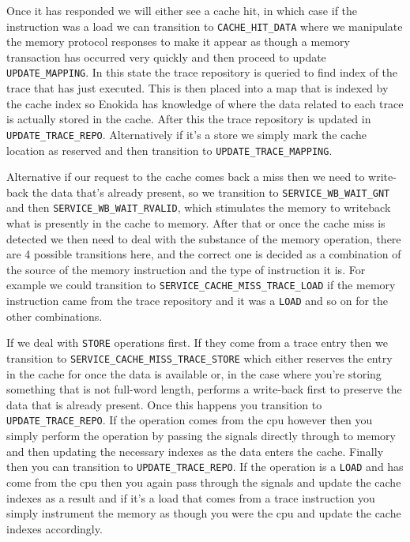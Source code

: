 Once it has responded we will either see a cache hit, in which case if the instruction was a load we can transition to \texttt{CACHE\_HIT\_DATA} where we manipulate the memory protocol responses to make it appear as though a memory transaction has occurred very quickly and then proceed to update \texttt{UPDATE\_MAPPING}. In this state the trace repository is queried to find index of the trace that has just executed. This is then placed into a map that is indexed by the cache index so Enokida has knowledge of where the data related to each trace is actually stored in the cache. After this the trace repository is updated in \texttt{UPDATE\_TRACE\_REPO}. Alternatively if it's a store we simply mark the cache location as reserved and then transition to \texttt{UPDATE\_TRACE\_MAPPING}. 

Alternative if our request to the cache comes back a miss then we need to write-back the data that's already present, so we transition to \texttt{SERVICE\_WB\_WAIT\_GNT} and then \texttt{SERVICE\_WB\_WAIT\_RVALID}, which stimulates the memory to writeback what is presently in the cache to memory. After that or once the cache miss is detected we then need to deal with the substance of the memory operation, there are 4 possible transitions here, and the correct one is decided as a combination of the source of the memory instruction and the type of instruction it is. For example we could transition to \texttt{SERVICE\_CACHE\_MISS\_TRACE\_LOAD} if the memory instruction came from the trace repository and it was a \texttt{LOAD} and so on for the other combinations.

If we deal with \texttt{STORE} operations first. If they come from a trace entry then we transition to \texttt{SERVICE\_CACHE\_MISS\_TRACE\_STORE} which either reserves the entry in the cache for once the data is available or, in the case where you're storing something that is not full-word length, performs a write-back first to preserve the data that is already present. Once this happens you transition to \texttt{UPDATE\_TRACE\_REPO}. If the operation comes from the \gls{cpu} however then you simply perform the operation by passing the signals directly through to memory and then updating the necessary indexes as the data enters the cache. Finally then you can transition to \texttt{UPDATE\_TRACE\_REPO}. If the operation is a \texttt{LOAD} and has come from the \gls{cpu} then you again pass through the signals and update the cache indexes as a result and if it's a load that comes from a trace instruction you simply instrument the memory as though you were the \gls{cpu} and update the cache indexes accordingly.

